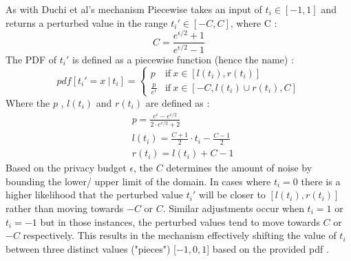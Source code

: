As with Duchi et al's mechanism Piecewise takes an input of  $t_i \in [-1, 1]$ and returns a perturbed value in the range $t_i' \in [-C, C]$, where C \citep{wang_collecting_2019}:
\begin{equation}
    C = \frac{e^{\epsilon/2} + 1}{e^{\epsilon/2} - 1}
\end{equation}
The PDF of $t_i'$  is defined as a piecewise function (hence the name) \citep{wang_collecting_2019}:
\begin{equation}
    pdf [t_i' = x \ | \ t_i ] = 
    \begin{cases}
        p & \text{if} \ x \in [l(t_i), r(t_i)] \\ 
        \frac{p}{e^\epsilon} & \text{if} \ x \in [-C, l(t_i) \cup r(t_i), C]
    \end{cases}
    \label{eq:piecewise-domain}
\end{equation}
Where the $p$ , $l(t_i)$ and $r(t_i)$ are defined as \citep{wang_collecting_2019}:
\begin{align}
    \label{piecewise-p}
    & p = \frac{e^\epsilon - e^{\epsilon/2}}{2 \cdot e^{\epsilon/2} + 2} \\ 
    \label{piecewise-l-i}
    & l(t_i) = \frac{C + 1}{2} \cdot t_i - \frac{C - 1}{2} \\
    \label{piecewise-r-i}
    & r(t_i) = l(t_i) + C - 1
\end{align}
Based on the privacy budget $\epsilon$, the $C$ determines the amount of noise by bounding the lower/ upper limit of the domain.
In cases where $t_i = 0$ there is a higher likelihood that the perturbed value $t_i'$ will be closer to $[l(t_i), r(t_i)]$ rather than moving towards $-C$ or $C$.
Similar adjustments occur when $t_i = 1$ or $t_i = -1$ but in those instances, the perturbed values tend to move towards $C$ or $-C$ respectively. 
This results in the mechanism effectively shifting the value of $t_i$ between three distinct values ("pieces") [$-1, 0, 1$] based on the provided \gls{pdf} \citep{wang_collecting_2019}.


